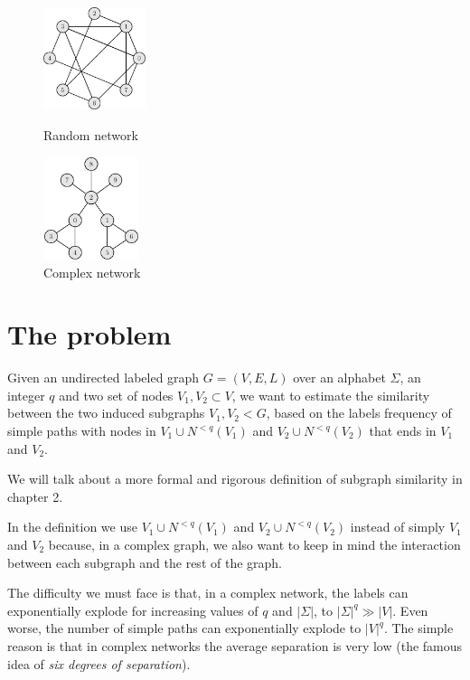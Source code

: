 \begin{figure}[h]
	\centering
	\begin{minipage}[t]{.45\textwidth}
		\centering
		\includegraphics[width=3cm,height=3cm]{figure/figure-1-3}
		\caption{Random network}
	\end{minipage}\hfill
	\begin{minipage}[t]{.45\textwidth}
		\centering
		\includegraphics[width=2.8cm,height=3cm]{figure/figure-1-4}
		\caption{Complex network}
	\end{minipage}
\end{figure}

\section{The problem}

\begin{problema}
	Given an undirected labeled graph $G=(V,E,L)$ over an alphabet $\Sigma$, an integer $q$
	and two set of nodes $V_{1}, V_{2} \subset V$, we want to estimate the similarity between the two induced subgraphs $V_{1}, V_{2} < G$, based on the labels frequency of simple paths with nodes in $V_{1} \cup N^{<q}(V_{1})$ and $V_{2} \cup N^{<q}(V_{2})$ that ends in $V_1$ and $V_2$.
\end{problema}

We will talk about a more formal and rigorous definition of subgraph similarity in chapter 2.\medskip

In the definition we use $V_{1} \cup N^{<q}(V_{1})$ and $V_{2} \cup N^{<q}(V_{2})$ instead of simply $V_{1}$ and $V_{2}$ because, in a complex graph, we also want to keep in mind the interaction between each subgraph and the rest of the graph.\medskip

The difficulty we must face is that, in a complex network, the labels can exponentially explode for increasing values of $q$ and $|\Sigma|$, to $|\Sigma|^{q} \gg |V|$. Even worse, the number of simple paths can exponentially explode to $|V|^{q}$.  The simple reason is that in complex networks the average separation is very low (the famous idea of \textit{six degrees of separation}).\medskip


